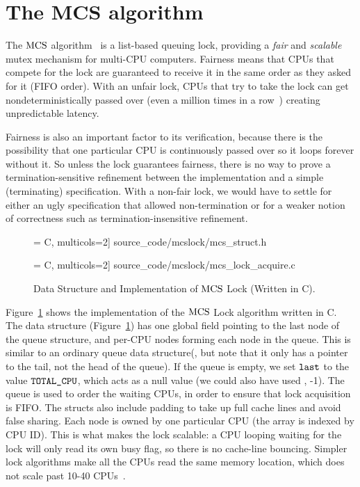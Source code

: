 \section{The MCS algorithm}
\label{chapter:mcslock:sec:overview}

The $\mathrm{MCS}$ algorithm~\cite{mcs91} is a list-based queuing lock,
providing a \emph{fair} and \emph{scalable} mutex mechanism for
multi-CPU computers. Fairness means that
CPUs that compete for the lock are guaranteed to receive it in the same
order as they asked for it (FIFO order). With an unfair lock, CPUs
that try to take the lock can get nondeterministically passed over
(even a million times in a row~\cite{lwn:ticketlocks}) creating
unpredictable latency.

Fairness is also an important factor to its verification, because
there is the possibility that one particular CPU is continuously
passed over so it loops forever without it.
So unless the lock
guarantees fairness, there is no way to prove a termination-sensitive
refinement between the implementation and a simple (terminating)
specification. With a non-fair lock, we would have to settle for
either an ugly specification that allowed non-termination or for a weaker notion of correctness such as termination-insensitive
refinement.
\begin{figure}
 = C, multicols=2] {source_code/mcslock/mcs_struct.h}
\vspace{1em}

 = C, multicols=2] {source_code/mcslock/mcs_lock_acquire.c}
\caption{Data Structure and Implementation of $\mathrm{MCS}$ Lock (Written in C).}
\label{fig:chapter:mcslock:mcs_lock}
\end{figure}

Figure~\ref{fig:chapter:mcslock:mcs_lock} shows the implementation of the $\mathrm{MCS}$ Lock algorithm written in C. 
The data structure  (Figure~\ref{fig:chapter:mcslock:mcs_lock}) has
one global field pointing to the last node of the queue structure, and
per-CPU nodes forming each node in the queue. This is similar to an
ordinary queue data structure(, but note that it only has a
pointer to the tail, not the head of the queue).  If the queue is
empty, we set ${\mathrm{\texttt{last}}}$ to the value ${\mathrm{\texttt{TOTAL\_CPU}}}$, which
acts as a null value (we could also have used \eg, -1). The queue is
used to order the waiting CPUs, in order to ensure that lock
acquisition is FIFO. The structs also include padding to take up full cache lines and avoid false sharing.  Each node is owned by one
particular CPU (the array is indexed by CPU ID).  This is what makes
the lock scalable: a CPU looping waiting for the lock will only read
its own busy flag, so there is no cache-line bouncing. Simpler lock
algorithms make all the CPUs read the same memory location, which does
not scale past 10-40 CPUs~\cite{Boyd-wickizer12}.

